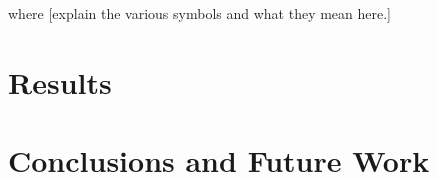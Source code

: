 \documentclass[journal]{new-aiaa} %
\begin{document}
\noindent where [explain the various symbols and what they mean here.]


\section{Results}
\label{sec:results}









\section{Conclusions and Future Work}
\label{sec:conclusions}










{} %






\appendix
\end{document}
